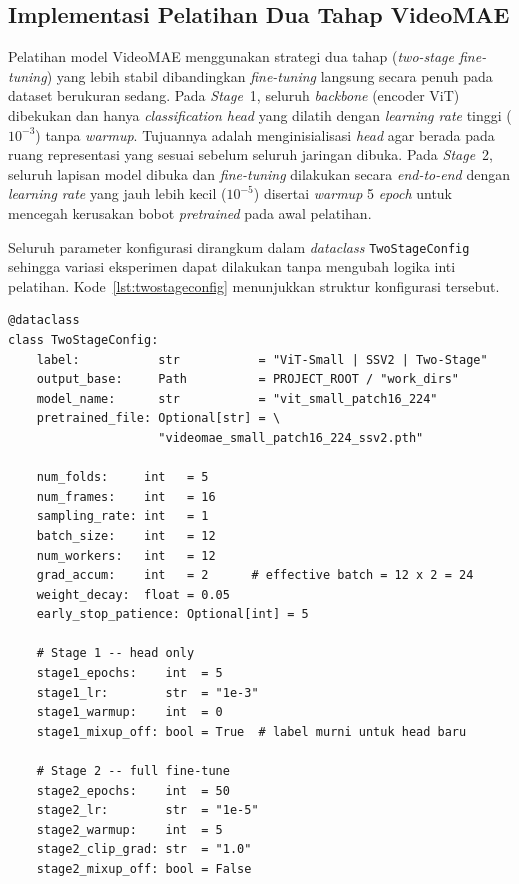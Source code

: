 \subsection{Implementasi Pelatihan Dua Tahap VideoMAE} \label{IV.ImplTwostage}

Pelatihan model VideoMAE menggunakan strategi dua tahap (\textit{two-stage fine-tuning}) yang lebih stabil dibandingkan \textit{fine-tuning} langsung secara penuh pada dataset berukuran sedang. Pada \textit{Stage}~1, seluruh \textit{backbone} (encoder ViT) dibekukan dan hanya \textit{classification head} yang dilatih dengan \textit{learning rate} tinggi ($10^{-3}$) tanpa \textit{warmup}. Tujuannya adalah menginisialisasi \textit{head} agar berada pada ruang representasi yang sesuai sebelum seluruh jaringan dibuka. Pada \textit{Stage}~2, seluruh lapisan model dibuka dan \textit{fine-tuning} dilakukan secara \textit{end-to-end} dengan \textit{learning rate} yang jauh lebih kecil ($10^{-5}$) disertai \textit{warmup} 5 \textit{epoch} untuk mencegah kerusakan bobot \textit{pretrained} pada awal pelatihan.\par

Seluruh parameter konfigurasi dirangkum dalam \textit{dataclass} \texttt{TwoStageConfig} sehingga variasi eksperimen dapat dilakukan tanpa mengubah logika inti pelatihan. Kode~\ref{lst:twostageconfig} menunjukkan struktur konfigurasi tersebut.\par

\begin{lstlisting}[caption={Kode konfigurasi pelatihan dua tahap VideoMAE}, label={lst:twostageconfig}]
@dataclass
class TwoStageConfig:
    label:           str           = "ViT-Small | SSV2 | Two-Stage"
    output_base:     Path          = PROJECT_ROOT / "work_dirs"
    model_name:      str           = "vit_small_patch16_224"
    pretrained_file: Optional[str] = \
                     "videomae_small_patch16_224_ssv2.pth"

    num_folds:     int   = 5
    num_frames:    int   = 16
    sampling_rate: int   = 1
    batch_size:    int   = 12
    num_workers:   int   = 12
    grad_accum:    int   = 2      # effective batch = 12 x 2 = 24
    weight_decay:  float = 0.05
    early_stop_patience: Optional[int] = 5

    # Stage 1 -- head only
    stage1_epochs:    int  = 5
    stage1_lr:        str  = "1e-3"
    stage1_warmup:    int  = 0
    stage1_mixup_off: bool = True  # label murni untuk head baru

    # Stage 2 -- full fine-tune
    stage2_epochs:    int  = 50
    stage2_lr:        str  = "1e-5"
    stage2_warmup:    int  = 5
    stage2_clip_grad: str  = "1.0"
    stage2_mixup_off: bool = False
\end{lstlisting}

